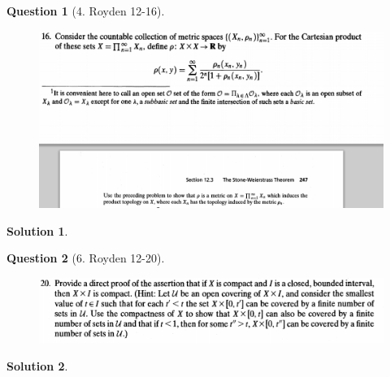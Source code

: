 \documentclass{article} %
\theoremstyle{quest}
\newtheorem*{question}{Question}
\newtheorem*{solution}{Solution}
\begin{document}
\newpage

\begin{question}[4. Royden 12-16]
\hfill
\begin{figure}[h!]
  \centering
    \includegraphics[width=1\textwidth]{12-16}
\end{figure}
\end{question}
\begin{solution}
\end{solution}

\pagebreak

\begin{question}[6. Royden 12-20]
\hfill
\begin{figure}[h!]
  \centering
    \includegraphics[width=1\textwidth]{12-20}
\end{figure}
\end{question}
\begin{solution}
\end{solution}
\end{document}
